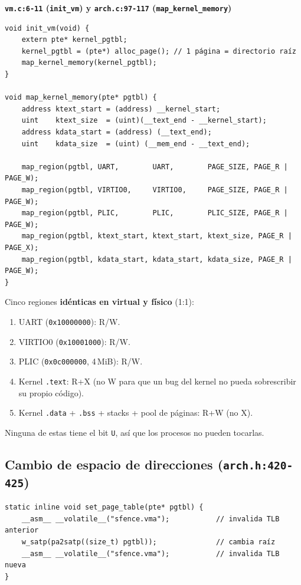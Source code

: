 \documentclass[11pt,a4paper]{article}
\begin{document}
\begin{walkthrough}
\textbf{\texttt{vm.c:6-11} (\texttt{init\_vm}) y \texttt{arch.c:97-117} (\texttt{map\_kernel\_memory})}

\begin{lstlisting}[style=cstyle]
void init_vm(void) {
    extern pte* kernel_pgtbl;
    kernel_pgtbl = (pte*) alloc_page(); // 1 página = directorio raíz
    map_kernel_memory(kernel_pgtbl);
}

void map_kernel_memory(pte* pgtbl) {
    address ktext_start = (address) __kernel_start;
    uint    ktext_size  = (uint)(__text_end - __kernel_start);
    address kdata_start = (address) (__text_end);
    uint    kdata_size  = (uint) (__mem_end - __text_end);

    map_region(pgtbl, UART,        UART,        PAGE_SIZE, PAGE_R | PAGE_W);
    map_region(pgtbl, VIRTIO0,     VIRTIO0,     PAGE_SIZE, PAGE_R | PAGE_W);
    map_region(pgtbl, PLIC,        PLIC,        PLIC_SIZE, PAGE_R | PAGE_W);
    map_region(pgtbl, ktext_start, ktext_start, ktext_size, PAGE_R | PAGE_X);
    map_region(pgtbl, kdata_start, kdata_start, kdata_size, PAGE_R | PAGE_W);
}
\end{lstlisting}

Cinco regiones \textbf{idénticas en virtual y físico} (1:1):

\begin{enumerate}[nosep,leftmargin=*]
    \item UART (\texttt{0x10000000}): R/W.
    \item VIRTIO0 (\texttt{0x10001000}): R/W.
    \item PLIC (\texttt{0x0c000000}, 4\,MiB): R/W.
    \item Kernel \texttt{.text}: R+X (no W para que un bug del
        kernel no pueda sobrescribir su propio código).
    \item Kernel \texttt{.data} + \texttt{.bss} + stacks + pool de
        páginas: R+W (no X).
\end{enumerate}

Ninguna de estas tiene el bit \texttt{U}, así que los procesos no
pueden tocarlas.
\end{walkthrough}

\subsection*{Cambio de espacio de direcciones (\texttt{arch.h:420-425})}

\begin{lstlisting}[style=cstyle]
static inline void set_page_table(pte* pgtbl) {
    __asm__ __volatile__("sfence.vma");           // invalida TLB anterior
    w_satp(pa2satp((size_t) pgtbl));              // cambia raíz
    __asm__ __volatile__("sfence.vma");           // invalida TLB nueva
}
\end{lstlisting}
\end{document}
